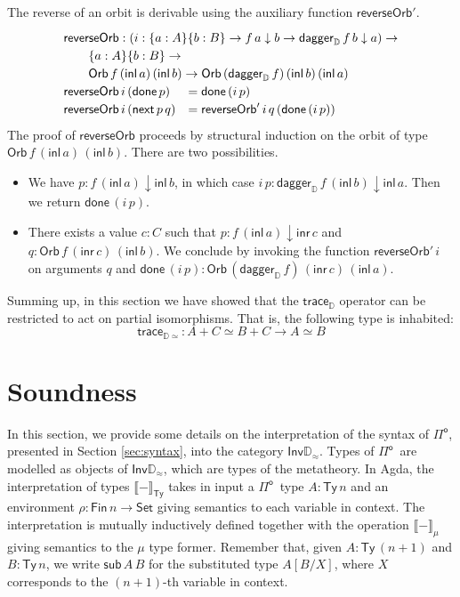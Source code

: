 \documentclass[runningheads,a4paper]{llncs}
\newcommand{\Pio}{\ensuremath{\mathsf{\Pi}^{\mathsf{o}}}}
\newcommand{\Set}{\mathsf{Set}}
\newcommand{\inl}{\mathsf{inl}}
\newcommand{\inr}{\mathsf{inr}}
\newcommand{\Inv}{\mathsf{Inv}}
\newcommand{\Ty}{\mathsf{Ty}}
\newcommand{\sub}{\mathsf{sub}}
\newcommand{\dn}{\downarrow}
\newcommand{\D}{\mathbb{D}}
\newcommand{\Dapprox}{\mathbb{D}_{\approx}}
\newcommand{\traceD}{\mathsf{trace}_\D}
\newcommand{\daggerD}{\mathsf{dagger}_\D}
\newcommand{\Orb}[3]{\mathsf{Orb}\,#1\,#2\,#3}
\newcommand{\done}{\mathsf{done}}
\renewcommand{\next}{\mathsf{next}}
\newcommand{\reverseOrbit}{\mathsf{reverseOrb}}
\newcommand{\semTy}[1]{{\llbracket #1 \rrbracket}_\mathsf{Ty}}
\newcommand{\semMu}[1]{{\llbracket #1 \rrbracket}_\mu}
\newcommand{\semTrace}{\mathsf{trace}_{\D\simeq}}
\begin{document}
The reverse of an orbit is derivable using the auxiliary function $\reverseOrbit'$.
\[
\def\arraystretch{1.2}
\begin{array}{ll}
\multicolumn{2}{l}{\reverseOrbit : (i : \{a : A\} \{b : B\} \to f \,a
  \dn b \to \daggerD\,f  \,b \dn a) \to} \\
\multicolumn{2}{l}{\qquad \{a : A\} \{b : B\} \to} \\
\multicolumn{2}{l}{\qquad \Orb f {(\inl\,a)}
  {(\inl\,b)} \to \Orb  {(\daggerD\,f)} {(\inl\,b)} {(\inl\,a)}}\\
\reverseOrbit \,i\, (\done \,p) &= \done \, (i \,p) \\
\reverseOrbit \,i\,(\next\,p\,q) &= \reverseOrbit' \,i\,q \,(\done \,(i\,p))
\end{array}
\]
The proof of $\reverseOrbit$ proceeds by structural induction on the
orbit of type
$\Orb f {(\inl\,a)} {(\inl\,b)}$. There are two possibilities.
\begin{itemize}
\item We have $p : f\,(\inl\,a) \dn
\inl\,b$, in which case $i\,p : \daggerD\,f\,(\inl\,b) \dn
\inl\,a$. Then we return $\done\,(i\,p)$.
\item There exists a value $c : C$ such that $p :
  f\,(\inl\,a) \dn \inr\,c$ and $q : \Orb f {(\inr\,c)}
  {(\inl\,b)}$. We conclude by invoking the function
  $\reverseOrbit' \,i$ on arguments $q$ and $\done\,(i\,p) : \Orb
  {(\daggerD \,f)} {(\inr\,c)} {(\inl\,a)}$.
\end{itemize}

Summing up, in this section we have showed that the $\traceD$ operator
can be restricted to act on partial isomorphisms. That is, the
following type is inhabited:
\[
\semTrace : A + C\simeq B + C \to A \simeq B
\]

\section{Soundness}\label{sec:interpretation}

In this section, we provide some details on the interpretation of the
syntax of \Pio, presented in Section \ref{sec:syntax}, into the
category $\Inv\Dapprox$. Types of \Pio\ are modelled as objects of
$\Inv\Dapprox$, which are types of the metatheory. In Agda, the
interpretation of types $\semTy -$ takes in input a \Pio\ type
$A : \Ty\,n$ and an environment $\rho : \mathsf{Fin}\,n \to \Set$
giving semantics to each variable in context. The interpretation is
mutually inductively defined together with the operation $\semMu -$
giving semantics to the $\mu$ type former. Remember that, given $A :
\Ty\,(n+1)$ and $B : \Ty\,n$, we write $\sub\,A \,B$ for the
substituted type $A[B/X]$, where $X$ corresponds to the $(n+1)$-th
variable in context.  
\end{document}
